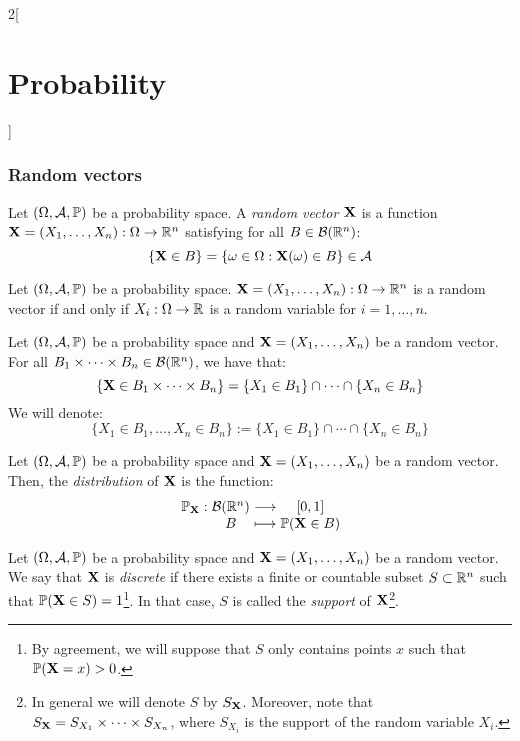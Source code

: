 \documentclass[../../../main.tex]{subfiles}
\begin{document}
\begin{multicols}{2}[\section{Probability}]
  \subsubsection{Random vectors}
  \begin{definition}
    Let $(\Omega,\mathcal{A},\mathbb{P})$ be a probability space. A \textit{random vector $\boldsymbol{\mathrm{X}}$} is a function $\boldsymbol{\mathrm{X}}=(X_1,\ldots,X_n):\Omega\rightarrow\mathbb{R}^n$ satisfying for all $B\in\mathcal{B}(\mathbb{R}^n)$: $$\{\boldsymbol{\mathrm{X}}\in B\}=\{\omega\in\Omega:\boldsymbol{\mathrm{X}}(\omega)\in B\}\in\mathcal{A}$$
  \end{definition}
  \begin{prop}
    Let $(\Omega,\mathcal{A},\mathbb{P})$ be a probability space. $\boldsymbol{\mathrm{X}}=(X_1,\ldots,X_n):\Omega\rightarrow\mathbb{R}^n$ is a random vector if and only if $X_i:\Omega\rightarrow\mathbb{R}$ is a random variable for $i=1,\ldots,n$.
  \end{prop}
  \begin{definition}
    Let $(\Omega,\mathcal{A},\mathbb{P})$ be a probability space and $\boldsymbol{\mathrm{X}}=(X_1,\ldots,X_n)$ be a random vector. For all $B_1\times\cdots\times B_n\in\mathcal{B}(\mathbb{R}^n)$, we have that: $$\{\boldsymbol{\mathrm{X}}\in B_1\times\cdots\times B_n\}=\{X_1\in B_1\}\cap\cdots\cap\{X_n\in B_n\}$$ We will denote: $$\{X_1\in B_1,\ldots,X_n\in B_n\}:=\{X_1\in B_1\}\cap\cdots\cap\{X_n\in B_n\}$$
  \end{definition}
  \begin{definition}
    Let $(\Omega,\mathcal{A},\mathbb{P})$ be a probability space and $\boldsymbol{\mathrm{X}}=(X_1,\ldots,X_n)$ be a random vector. Then, the \textit{distribution} of $\boldsymbol{\mathrm{X}}$ is the function:
    $$
      \function{\Prob_{\vectorfunction{X}}}{\mathcal{B}(\RR^n)}{[0,1]}{B}{\Prob(\vectorfunction{X}\in B)}
    $$
  \end{definition}
  \begin{definition}
    Let $(\Omega,\mathcal{A},\mathbb{P})$ be a probability space and $\boldsymbol{\mathrm{X}}=(X_1,\ldots,X_n)$ be a random vector. We say that $\boldsymbol{\mathrm{X}}$ is \textit{discrete} if there exists a finite or countable subset $S\subset\mathbb{R}^n$ such that $\mathbb{P}(\boldsymbol{\mathrm{X}}\in S)=1$\footnote{By agreement, we will suppose that $S$ only contains points $x$ such that $\mathbb{P}(\boldsymbol{\mathrm{X}}=x)>0$.}. In that case, $S$ is called the \textit{support} of $\boldsymbol{\mathrm{X}}$\footnote{In general we will denote $S$ by $S_{\boldsymbol{\mathrm{X}}}$. Moreover, note that $S_{\boldsymbol{\mathrm{X}}}=S_{X_1}\times\cdots\times S_{X_n}$, where $S_{X_i}$ is the support of the random variable $X_i$.}.

\end{definition}
\end{multicols}
\end{document}
